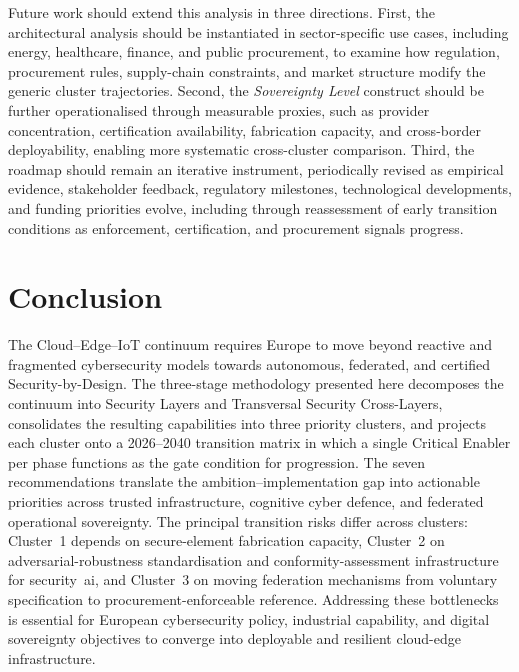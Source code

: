 \documentclass{ieeeaccess}
\begin{document}
Future work should extend this analysis in three directions. First, the architectural analysis should be instantiated in sector-specific use cases, including energy, healthcare, finance, and public procurement, to examine how regulation, procurement rules, supply-chain constraints, and market structure modify the generic cluster trajectories. Second, the \emph{Sovereignty Level} construct should be further operationalised through measurable proxies, such as provider concentration, certification availability, fabrication capacity, and cross-border deployability, enabling more systematic cross-cluster comparison. Third, the roadmap should remain an iterative instrument, periodically revised as empirical evidence, stakeholder feedback, regulatory milestones, technological developments, and funding priorities evolve, including through reassessment of early transition conditions as enforcement, certification, and procurement signals progress.


\section{Conclusion}
\label{sec:concl}

The Cloud--Edge--IoT continuum requires Europe to move beyond reactive and fragmented cybersecurity models towards autonomous, federated, and certified Security-by-Design. The three-stage methodology presented here decomposes the continuum into Security Layers and Transversal Security Cross-Layers, consolidates the resulting capabilities into three priority clusters, and projects each cluster onto a 2026--2040 transition matrix in which a single Critical Enabler per phase functions as the gate condition for progression. The seven recommendations translate the ambition--implementation gap into actionable priorities across trusted infrastructure, cognitive cyber defence, and federated operational sovereignty. The principal transition risks differ across clusters: Cluster~1 depends on secure-element fabrication capacity, Cluster~2 on adversarial-robustness standardisation and conformity-assessment infrastructure for security~\gls{ai}, and Cluster~3 on moving federation mechanisms from voluntary specification to procurement-enforceable reference. Addressing these bottlenecks is essential for European cybersecurity policy, industrial capability, and digital sovereignty objectives to converge into deployable and resilient cloud-edge infrastructure.

\end{document}
